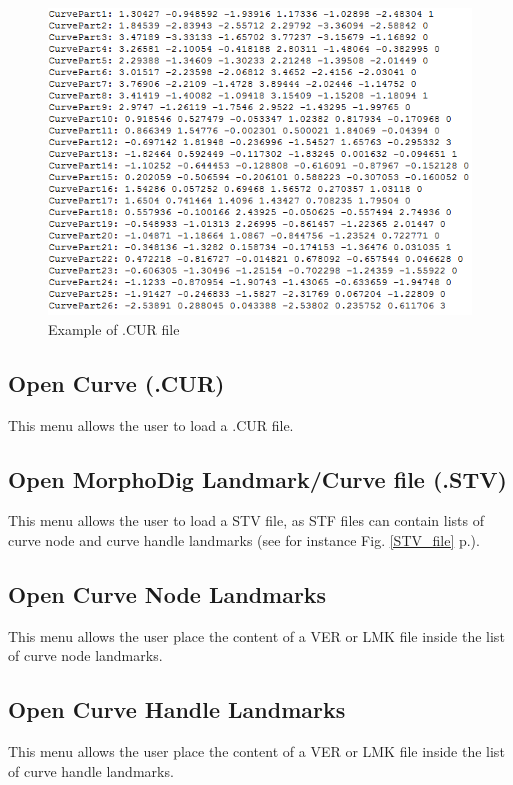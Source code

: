 \begin{figure}[t] 
  \centering
  \includegraphics[scale=0.5]{images/07/curves/CUR_file.png} 
	\caption{Example of .CUR file}
 
\end{figure}

\subsection{Open Curve (.CUR)}
This menu allows the user to load a .CUR file.
\subsection{Open MorphoDig Landmark/Curve file (.STV)}
This menu allows the user to load a STV file, as STF files can contain lists of curve node and curve handle landmarks (see for instance Fig. \ref{STV_file} p.\pageref{STV_file}).
\subsection{Open Curve Node Landmarks}
This menu allows the user place the content of a VER or LMK file inside the list of curve node landmarks.
\subsection{Open Curve Handle Landmarks}
This menu allows the user place the content of a VER or LMK file inside the list of curve handle landmarks.

